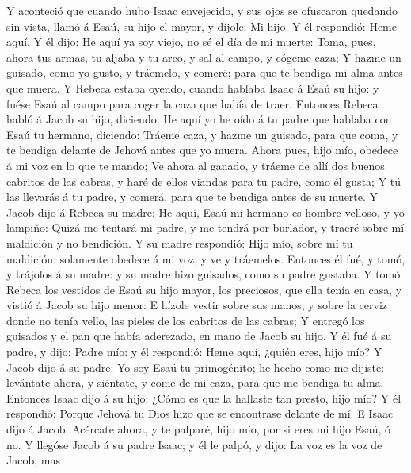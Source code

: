  Y aconteció que cuando hubo Isaac envejecido, y sus ojos
se ofuscaron quedando sin vista, llamó á Esaú, su hijo el mayor, y
díjole: Mi hijo. Y él respondió: Heme aquí.  Y él dijo: He
aquí ya soy viejo, no sé el día de mi muerte:  Toma, pues,
ahora tus armas, tu aljaba y tu arco, y sal al campo, y cógeme caza;
 Y hazme un guisado, como yo gusto, y tráemelo, y comeré;
para que te bendiga mi alma antes que muera.  Y Rebeca
estaba oyendo, cuando hablaba Isaac á Esaú su hijo: y fuése Esaú al
campo para coger la caza que había de traer.  Entonces
Rebeca habló á Jacob su hijo, diciendo: He aquí yo he oído á tu padre
que hablaba con Esaú tu hermano, diciendo:  Tráeme caza, y
hazme un guisado, para que coma, y te bendiga delante de Jehová antes
que yo muera.  Ahora pues, hijo mío, obedece á mi voz en
lo que te mando;  Ve ahora al ganado, y tráeme de allí dos
buenos cabritos de las cabras, y haré de ellos viandas para tu padre,
como él gusta;  Y tú las llevarás á tu padre, y comerá,
para que te bendiga antes de su muerte.  Y Jacob dijo á
Rebeca su madre: He aquí, Esaú mi hermano es hombre velloso, y yo
lampiño:  Quizá me tentará mi padre, y me tendrá por
burlador, y traeré sobre mí maldición y no bendición.  Y
su madre respondió: Hijo mío, sobre mí tu maldición: solamente obedece á
mi voz, y ve y tráemelos.  Entonces él fué, y tomó, y
trájolos á su madre: y su madre hizo guisados, como su padre gustaba.
 Y tomó Rebeca los vestidos de Esaú su hijo mayor, los
preciosos, que ella tenía en casa, y vistió á Jacob su hijo menor:
 E hízole vestir sobre sus manos, y sobre la cerviz donde
no tenía vello, las pieles de los cabritos de las cabras;
 Y entregó los guisados y el pan que había aderezado, en
mano de Jacob su hijo.  Y él fué á su padre, y dijo:
Padre mío: y él respondió: Heme aquí, ¿quién eres, hijo mío?
 Y Jacob dijo á su padre: Yo soy Esaú tu primogénito; he
hecho como me dijiste: levántate ahora, y siéntate, y come de mi caza,
para que me bendiga tu alma.  Entonces Isaac dijo á su
hijo: ¿Cómo es que la hallaste tan presto, hijo mío? Y él respondió:
Porque Jehová tu Dios hizo que se encontrase delante de mí.
 E Isaac dijo á Jacob: Acércate ahora, y te palparé, hijo
mío, por si eres mi hijo Esaú, ó no.  Y llegóse Jacob á
su padre Isaac; y él le palpó, y dijo: La voz es la voz de Jacob, mas
